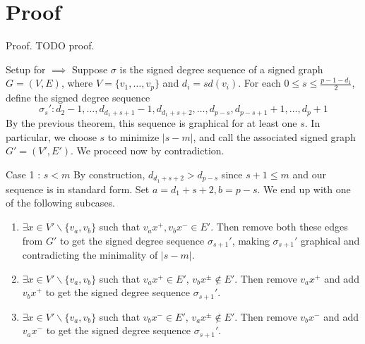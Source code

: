 \section{Proof}

\begin{frame}{Proof.}
	TODO proof.
\end{frame}

\begin{frame}{Setup for $\implies$}
	Suppose $\sigma$ is the signed degree sequence of a signed graph $G = (V,E)$, where $V = \{v_1,\dots,v_p\}$ and $d_i = sd(v_i)$. For each $0 \leq s \leq \frac{p-1-d_1}{2}$, define the signed degree sequence
	\begin{equation*}
		\sigma_s' : d_2-1,\dots,d_{d_1+s+1}-1,d_{d_1+s+2},\dots,d_{p-s},d_{p-s+1}+1,\dots,d_p+1
	\end{equation*}
	By the previous theorem, this sequence is graphical for at least one $s$. In particular, we choose $s$ to minimize $|s-m|$, and call the associated signed graph $G' = (V',E')$. We proceed now by contradiction.
\end{frame}

\begin{frame}{Case 1 : $s < m$}
	By construction, $d_{d_1+s+2} > d_{p-s}$ since $s+1 \leq m$ and our sequence is in standard form. Set $a = d_1+s+2, b = p - s$. We end up with one of the following subcases.
	\begin{enumerate}
		\item $\exists x \in V'\backslash\{v_a,v_b\}$ such that $v_ax^{+}, v_bx^{-} \in E'$. Then remove both these edges from $G'$ to get the signed degree sequence $\sigma_{s+1}'$, making $\sigma_{s+1}'$ graphical and contradicting the minimality of $|s - m|$.
		\item $\exists x \in V'\backslash\{v_a,v_b\}$ such that $v_ax^{+} \in E'$, $v_bx^{\pm} \notin E'$. Then remove $v_ax^{+}$ and add $v_bx^{+}$ to get the signed degree sequence $\sigma_{s+1}'$.
		\item $\exists x \in V'\backslash\{v_a,v_b\}$ such that $v_bx^{-} \in E'$, $v_ax^{\pm} \notin E'$. Then remove $v_bx^{-}$ and add $v_ax^{-}$ to get the signed degree sequence $\sigma_{s+1}'$.
	\end{enumerate}
\end{frame}

